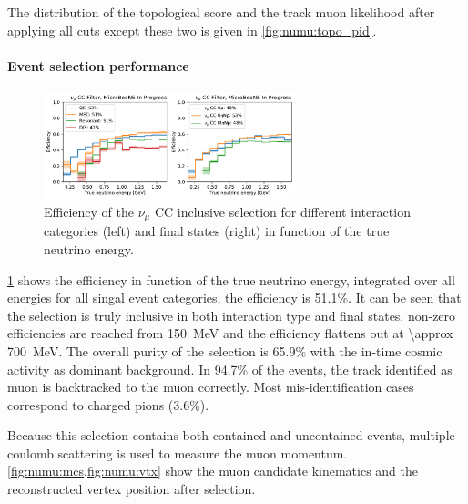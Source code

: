 The distribution of the topological score and the track muon likelihood after applying all cuts except these two is given in \cref{fig:numu:topo_pid}.

\paragraph{Event selection performance}

\begin{figure}[H]
    \centering
    \includegraphics[width=0.65\textwidth]{NuMuCCsel/Images/run1/numu_efficiency_run1.pdf}
    \caption{Efficiency of the $\nu_\mu$ CC inclusive selection for different interaction categories (left) and final states (right) in function of the true neutrino energy. }
    \label{fig:numu:eff_r1}
\end{figure}

\cref{fig:numu:eff_r1} shows the efficiency in function of the true neutrino energy, integrated over all energies for all singal event categories, the efficiency is 51.1\%. It can be seen that the selection is truly inclusive in both interaction type and final states. non-zero efficiencies are reached from \SI{150}{\MeV} and the efficiency flattens out at \SI{\approx 700}{\MeV}. The overall purity of the selection is 65.9\% with the in-time cosmic activity as dominant background. In 94.7\% of the events, the track identified as muon is backtracked to the muon correctly. Most mis-identification cases correspond to charged pions (3.6\%).

Because this selection contains both contained and uncontained events, multiple coulomb scattering is used to measure the muon momentum. \cref{fig:numu:mcs,fig:numu:vtx} show the muon candidate kinematics and the reconstructed vertex position after selection.


